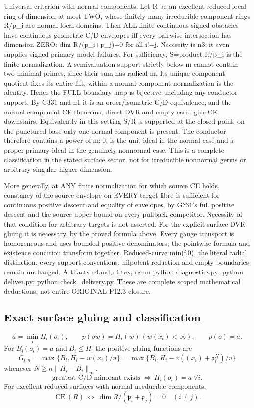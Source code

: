\documentclass[11pt]{article}
\begin{document}
Universal criterion with normal components. Let R be an excellent reduced local ring of dimension at most TWO, whose finitely many irreducible component rings R/p\_i are normal local domains. Then ALL finite continuous signed obstacles have continuous geometric C/D envelopes iff every pairwise intersection has dimension ZERO: dim R/(p\_i+p\_j)=0 for all i!=j. Necessity is n3; it even supplies signed primary-model failures. For sufficiency, S=product R/p\_i is the finite normalization. A semivaluation support strictly below m cannot contain two minimal primes, since their sum has radical m. Its unique component quotient fixes its entire lift; within a normal component normalization is the identity. Hence the FULL boundary map is bijective, including any conductor support. By G331 and n1 it is an order/isometric C/D equivalence, and the normal component CE theorems, direct DVR and empty cases give CE downstairs. Equivalently in this setting S/R is supported at the closed point: on the punctured base only one normal component is present. The conductor therefore contains a power of m; it is the unit ideal in the normal case and a proper primary ideal in the genuinely nonnormal case. This is a complete classification in the stated surface sector, not for irreducible nonnormal germs or arbitrary singular higher dimension.

More generally, at ANY finite normalization for which source CE holds, constancy of the source envelope on EVERY target fibre is sufficient for continuous positive descent and equality of envelopes, by G331's full positive descent and the source upper bound on every pullback competitor. Necessity of that condition for arbitrary targets is not asserted. For the explicit surface DVR gluing it is necessary, by the proved formula above. Every gauge transport is homogeneous and uses bounded positive denominators; the pointwise formula and existence condition transform together. Reduced-curve min(f,0), the literal radial distinction, every-support conventions, nilpotent reduction and empty boundaries remain unchanged. Artifacts n4.md,n4.tex; rerun python diagnostics.py; python deliver.py; python check\_delivery.py. These are complete scoped mathematical deductions, not entire ORIGINAL P12.3 closure.

\subsection*{Exact surface gluing and classification}
\[
 a=\min_i H_i(o_i),\qquad
 p(\rho w)=H_i(w)\ (w(x_i)<\infty),\qquad p(o)=a.
\]
For $B_i(o_i)=a$ and $B_i\le H_i$ the positive gluing functions are
\[
 G_{i,n}=\max\{B_i,H_i-w(x_i)/n\}
 =\max\{B_i,H_i-v((x_i)+\mathfrak a_i^N)/n\}
\]
whenever $N\ge n\|H_i-B_i\|_\infty$.
\[
 \text{greatest C/D minorant exists}\ \Longleftrightarrow\ H_i(o_i)=a\ \forall i.
\]
For excellent reduced surfaces with normal irreducible components,
\[
 \operatorname{CE}(R)\ \Longleftrightarrow\
 \dim R/(\mathfrak p_i+\mathfrak p_j)=0\quad(i\ne j).
\]
\end{document}
